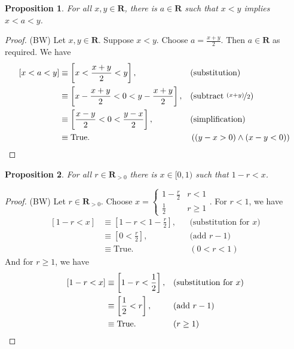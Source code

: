 \documentclass[12pt,fleqn,answers]{exam}
\newcommand{\reals}{\mathbf{R}}
\newcommand{\true}{\mathrm{True}}
\newenvironment{myproof}
  {\begin{shaded}\begin{proof}}
  {\end{proof}\end{shaded}}
\newtheorem{prop}{Proposition}
\begin{document}
\begin{prop}
  For all $x,y \in \reals$, there is $a \in \reals$ such that
    $x < y$ implies $x<a<y$.    
\end{prop}

\begin{myproof} (BW)
    Let $x,y \in \reals$. Suppose $x < y$. Choose $a = \frac{x+y}{2}$.
    Then $a \in \reals$ as required. We have
    \begin{align*}
      \left[ x < a < y \right] 
          &\equiv \left[ x < \frac{x+y}{2} < y \right], &&\text{(substitution)} \\
          & \equiv \left[ x - \frac{x+y}{2} < 0 < y - \frac{x+y}{2}  \right], &&\text{(subtract $\nicefrac{(x+y)}{2}$)} \\
          & \equiv \left[ \frac{x-y}{2} < 0 < \frac{y-x}{2}  \right], &&\text{(simplification)} \\
          & \equiv \true. &&\left((y-x > 0) \land  (x-y < 0) \right) \qedhere
    \end{align*} 
\end{myproof}


\begin{prop} 
     For all $r \in \reals_{>0}$ there is $x \in [0,1)$ such that $1-r < x$. 
\end{prop}

    
     
      \begin{myproof} (BW) Let $r \in \reals_{>0}$. Choose $x = \begin{cases} 1 - \frac{r}{2}  & r < 1 \\ \frac{1}{2} & r \geq 1 \end{cases}$. For $r < 1$, we have
      \begin{align*}
       \left[1-r < x \right] &\equiv \left[1-r < 1 - \frac{r}{2}  \right], && \text{(substitution for $x$)} \\
                                  &\equiv  \left[0 <  \frac{r}{2}  \right], && \text{(add $r-1$)} \\
                                  &\equiv \true.   &&(0 < r < 1)
      \end{align*}
      And for $r \geq 1$, we have
       \begin{align*}
       \left[1-r < x \right] &\equiv \left[1-r < \frac{1}{2}  \right], && \text{(substitution for $x$)} \\
                                  &\equiv  \left[\frac{1}{2}  <  r  \right], && \text{(add $r-1$)} \\
                                  &\equiv \true.   &&(r \geq 1) \qedhere
      \end{align*}
      \end{myproof}
     
\end{document}
